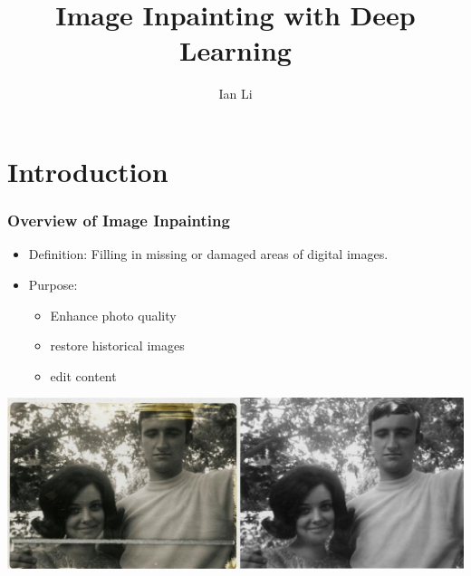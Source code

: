 \documentclass{beamer}
\title{Image Inpainting with Deep Learning}
\author{Ian Li}
\institute{Harvey Mudd College}
\begin{document}
\frame{\titlepage}
\begin{frame}
	\tableofcontents
\end{frame}

\section{Introduction}
\begin{frame}
	\frametitle{Overview of Image Inpainting}
	\begin{itemize}
		\item Definition: Filling in missing or damaged areas of digital images.
		\item Purpose: 
		\begin{itemize}
			\item Enhance photo quality
			\item restore historical images
			\item edit content
		\end{itemize}
	\end{itemize}
	\begin{center}
		\includegraphics[scale=4]{restoration.jpeg}
	\end{center}
\end{frame}
\end{document}
